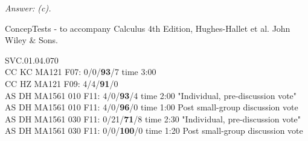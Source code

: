 {\it Answer: (c).} 


\medskip
ConcepTests - to accompany Calculus 4th Edition, Hughes-Hallet et al. John Wiley \& Sons.

SVC.01.04.070 \\
CC KC MA121 F07: 0/0/{\bf93}/7 time 3:00 \\
CC HZ MA121 F09: 4/4/{\bf91}/0  \\
AS DH MA1561 010 F11: 4/0/{\bf93}/4 time 2:00 "Individual, pre-discussion vote" \\
AS DH MA1561 010 F11: 4/0/{\bf96}/0 time 1:00 Post small-group discussion vote \\
AS DH MA1561 030 F11: 0/21/{\bf71}/8 time 2:30 "Individual, pre-discussion vote" \\
AS DH MA1561 030 F11: 0/0/{\bf100}/0 time 1:20 Post small-group discussion vote \\
